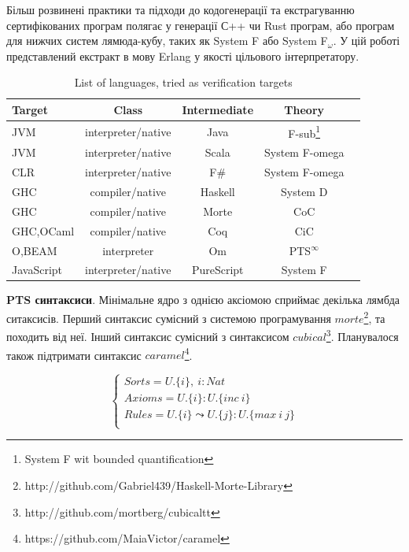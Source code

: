 Більш розвинені практики та підходи до кодогенерації та екстрагуванню
сертифікованих програм полягає у генерації С++ чи Rust програм, або програм
для нижчих систем лямюда-кубу, таких як System F або System F$_\omega$.
У цій роботі представлений екстракт в мову Erlang у якості цільового інтерпретатору.

\begin{table}[h]
\begin{center}
\caption{List of languages, tried as verification targets}
\begin{tabular}{lcccc}
\hline
\textbf{Target} & \textbf{Class} & \textbf{Intermediate} & \textbf{Theory}\\
\hline
JVM        & interpreter/native   & Java       & F-sub\footnote{System F wit bounded quantification}\\
JVM        & interpreter/native   & Scala      & System F-omega\\
CLR        & interpreter/native   & F\#        & System F-omega\\
GHC        & compiler/native      & Haskell    & System D\\
GHC        & compiler/native      & Morte      & CoC\\
GHC,OCaml  & compiler/native      & Coq        & CiC\\
O,BEAM     & interpreter          & Om         & PTS$^\infty$ \\
JavaScript & interpreter/native   & PureScript & System F\\
\hline
\end{tabular}
\end{center}
\end{table}

\textbf{PTS синтаксиси}. Мінімальне ядро з однією аксіомою
сприймає декілька лямбда ситаксисів.
Перший синтаксис сумісний з системою програмування
$morte$\footnote{http://github.com/Gabriel439/Haskell-Morte-Library}, та походить від неї.
Інший синтаксис сумісний з синтаксисом $cubical$\footnote{http://github.com/mortberg/cubicaltt}.
Планувалося також підтримати синтаксис $caramel$\footnote{https://github.com/MaiaVictor/caramel}.

\begin{equation}
\begin{cases}
Sorts = U.\{i\},\ i : Nat\\
Axioms = U.\{i\} : U.\{inc\ i\}\\
Rules = U.\{i\} \leadsto U.\{j\} : U.\{max\ i\ j\}\\
\end{cases}
\end{equation}

